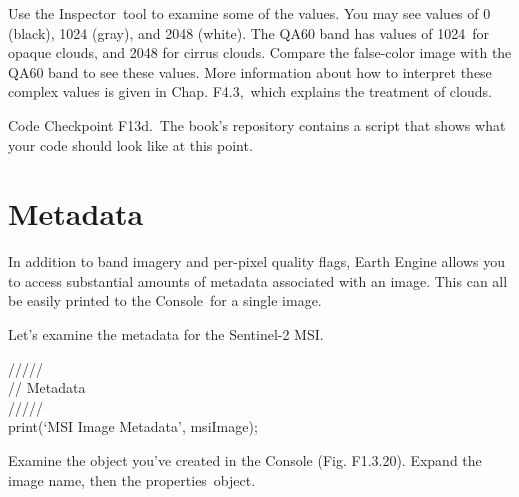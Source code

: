 \documentclass[
  letterpaper,
  DIV=11,
  numbers=noendperiod]{scrreprt}
\begin{document}
Use the Inspector~tool to examine some of the values. You may see values
of 0 (black), 1024 (gray), and 2048 (white). The QA60 band has values of
1024~for opaque clouds, and 2048 for cirrus clouds. Compare the
false-color image with the QA60 band to see these values. More
information about how to interpret these complex values is given in
Chap. F4.3,~which explains the treatment of clouds.

\begin{tcolorbox}[enhanced jigsaw, left=2mm, breakable, rightrule=.15mm, opacityback=0, colframe=quarto-callout-note-color-frame, colbacktitle=quarto-callout-note-color!10!white, arc=.35mm, opacitybacktitle=0.6, toptitle=1mm, colback=white, leftrule=.75mm, title=\textcolor{quarto-callout-note-color}{\faInfo}\hspace{0.5em}{Note}, toprule=.15mm, bottomtitle=1mm, titlerule=0mm, bottomrule=.15mm, coltitle=black]

Code Checkpoint F13d.~The book's repository contains a script that shows
what your code should look like at this point.

\end{tcolorbox}

\hypertarget{metadata}{%
\section{Metadata}\label{metadata}}

In addition to band imagery and per-pixel quality flags, Earth Engine
allows you to access substantial amounts of metadata associated with an
image. This can all be easily printed to the Console~for a single image.

Let's examine the metadata for the Sentinel-2 MSI.

/////\\
// Metadata\\
/////\\
print(`MSI Image Metadata', msiImage);

Examine the object you've created in the Console (Fig. F1.3.20). Expand
the image name, then the properties~object.
\end{document}
